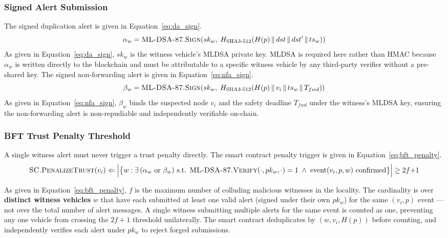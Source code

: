 \documentclass[12pt, a4paper]{report}
\begin{document}
\subsubsection{Signed Alert Submission}
The signed duplication alert is given in
Equation~\eqref{eq:da_sign}.
\begin{equation}
\alpha_w = \textsc{ML-DSA-87.Sign}\!\left(sk_w,\;
H_{\text{SHA3-512}}\!\left(
H(p) \,\|\, dst \,\|\, dst' \,\|\, ts_w
\right)\right)
\label{eq:da_sign}
\end{equation}
As given in Equation~\eqref{eq:da_sign}, $sk_w$
is the witness vehicle's \ac{MLDSA} private key.
\ac{MLDSA} is required here rather than \ac{HMAC}
because $\alpha_w$ is written directly to the
blockchain and must be attributable to a specific
witness vehicle by any third-party verifier without
a pre-shared key. The signed non-forwarding alert
is given in Equation~\eqref{eq:nfa_sign}.
\begin{equation}
\beta_w = \textsc{ML-DSA-87.Sign}\!\left(sk_w,\;
H_{\text{SHA3-512}}\!\left(
H(p) \,\|\, v_i \,\|\, ts_w \,\|\, T_{fwd}
\right)\right)
\label{eq:nfa_sign}
\end{equation}
As given in Equation~\eqref{eq:nfa_sign}, $\beta_w$
binds the suspected node $v_i$ and the safety
deadline $T_{fwd}$ under the witness's \ac{MLDSA}
key, ensuring the non-forwarding alert is
non-repudiable and independently verifiable
on-chain.


\subsubsection{BFT Trust Penalty Threshold}
A single witness alert must never trigger a trust
penalty directly. The smart contract penalty trigger
is given in Equation~\eqref{eq:bft_penalty}.
\begin{equation}
\textsc{SC.PenalizeTrust}(v_i) \Leftarrow
\Bigl|\bigl\{
w : \exists\,(\alpha_w \text{ or } \beta_w)
\text{ s.t. }
\textsc{ML-DSA-87.Verify}(\cdot,pk_w,\cdot) = 1
\;\land\; \text{event}(v_i,p,w)\text{ confirmed}
\bigr\}\Bigr|
\geq 2f{+}1
\label{eq:bft_penalty}
\end{equation}

As given in Equation~\eqref{eq:bft_penalty}, $f$ is
the maximum number of colluding malicious witnesses
in the locality. The cardinality is over
\textbf{distinct witness vehicles} $w$ that have
each submitted at least one valid alert
(signed under their own $pk_w$) for the same
$(v_i, p)$ event --- not over the total number of
alert messages. A single witness submitting multiple
alerts for the same event is counted as one, preventing
any one vehicle from crossing the $2f{+}1$ threshold
unilaterally. The smart contract deduplicates by
$(w, v_i, H(p))$ before counting, and independently
verifies each alert under $pk_w$ to reject forged
submissions.
\end{document}
